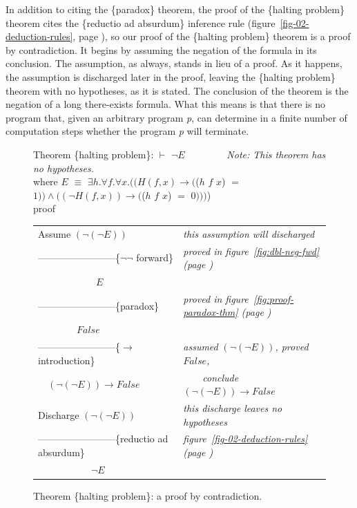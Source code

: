 In addition to citing the \{paradox\} theorem,
the proof of the \{halting problem\} theorem
cites the \{reductio ad absurdum\} inference rule
(figure~\ref{fig-02-deduction-rules}, page \pageref{fig-02-deduction-rules}),
so our proof of the \{halting problem\} theorem is a proof by contradiction.
It begins by assuming the negation of the formula in its conclusion.
The assumption, as always, stands in lieu of a proof.
As it happens, the assumption is discharged later in the proof,
leaving the \{halting problem\} theorem with no hypotheses,
as it is stated.
The conclusion of the theorem is the negation of a long there-exists formula.
What this means is that there is no program that,
given an arbitrary program \emph{p}, can
determine in a finite number of computation steps
whether the program \emph{p} will terminate.

\begin{figure}
Theorem \{halting problem\}: $\vdash$ $\neg E$ ~~~~~~~~\emph{Note: This theorem has no hypotheses.}\\
\hspace*{5mm}where $E$ $\equiv$ $\exists h. \forall f. \forall x.
((H(f, x) \rightarrow ($\textsf{($h$ $f$ $x$)} $=$ $1)) \wedge ((\neg H(f, x)) \rightarrow ($\textsf{($h$ $f$ $x$)} $=$ $0)))$)\\
proof
\begin{center}
\begin{tabular}{ll}
Assume $(\neg(\neg E))$                       &\emph{this assumption will discharged}\\
------------------------\{$\neg \neg$ forward\} &\emph{proved in figure~\ref{fig:dbl-neg-fwd} (page \pageref{fig:dbl-neg-fwd})}\\
~~~~~~~~~~~~$E$                               &\\
------------------------\{paradox\}           &\emph{proved in figure~\ref{fig:proof-paradox-thm} (page \pageref{fig:proof-paradox-thm})}\\
~~~~~~~~$False$                               &\\
------------------------\{$\rightarrow$ introduction\} &\emph{assumed} $(\neg(\neg E))$\emph{, proved} $False$\emph{,}\\
~~$(\neg(\neg E)) \rightarrow False$          &~~~~\emph{conclude} $(\neg(\neg E)) \rightarrow False$\\
Discharge $(\neg(\neg E))$                    &\emph{this discharge leaves no hypotheses}\\
------------------------\{reductio ad absurdum\}&\emph{figure~\ref{fig-02-deduction-rules} (page \pageref{fig-02-deduction-rules})}\\
~~~~~~~~~~~$\neg E$                           &\\
\end{tabular}
\end{center}
\caption{Theorem \{halting problem\}: a proof by contradiction.}
\label{fig:halting-proof-strategy}
\end{figure}


